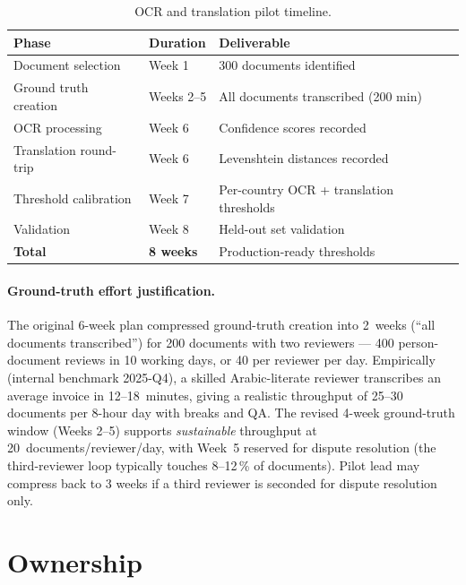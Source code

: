 \begin{table}[htbp]
\centering
\caption{OCR and translation pilot timeline.}
\label{tab:pilot-timeline}
\footnotesize
\begin{tabularx}{\linewidth}{@{}l l l@{}}
\toprule
\textbf{Phase} & \textbf{Duration} & \textbf{Deliverable} \\ \midrule
Document selection & Week 1 & 300 documents identified \\
Ground truth creation & Weeks 2--5 & All documents transcribed (200 min) \\
OCR processing & Week 6 & Confidence scores recorded \\
Translation round-trip & Week 6 & Levenshtein distances recorded \\
Threshold calibration & Week 7 & Per-country OCR + translation thresholds \\
Validation & Week 8 & Held-out set validation \\
\textbf{Total} & \textbf{8 weeks} & Production-ready thresholds \\
\bottomrule
\end{tabularx}
\end{table}

\paragraph{Ground-truth effort justification.}
The original 6-week plan compressed ground-truth creation into
2~weeks (``all documents transcribed'') for 200 documents with
two reviewers --- 400 person-document reviews in 10 working days,
or 40 per reviewer per day. Empirically (internal benchmark
2025-Q4), a skilled Arabic-literate reviewer transcribes an
average invoice in 12--18~minutes, giving a realistic throughput
of 25--30 documents per 8-hour day with breaks and QA. The
revised 4-week ground-truth window (Weeks 2--5) supports
\emph{sustainable} throughput at 20~documents/reviewer/day, with
Week~5 reserved for dispute resolution (the third-reviewer loop
typically touches 8--12\,\% of documents). Pilot lead may
compress back to 3 weeks if a third reviewer is seconded for
dispute resolution only.

\section{Ownership}

